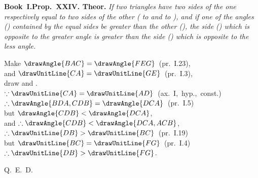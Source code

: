 \documentclass[12pt]{article}\usepackage{geometry}\geometry{a5paper,margin=1.5cm}
\begin{document}
\begin{minipage}[t]{0.52\linewidth}\vspace{0pt}%
\textbf{Book~I.\enspace Prop.\ XXIV. Theor.}
\medskip\noindent\itshape
If two triangles have two sides of the one respectively equal
to two sides of the other ( to 
and  to ), and if one of the
angles () contained by the equal sides be
greater than the other (), the side
() which is opposite to the greater angle is
greater than the side () which is opposite to
the less angle.
\bigskip\noindent\upshape\begin{center}
Make $\drawAngle{BAC}=\drawAngle{FEG}$~(pr.~I.23),\\
and $\drawUnitLine{CA}=\drawUnitLine{GE}$~(pr.~I.3),\\
draw  and .\\[6pt]
$\because \drawUnitLine{CA}=\drawUnitLine{AD}$~(ax.~I,~hyp.,~const.)\\
$\therefore \drawAngle{BDA,CDB}=\drawAngle{DCA}$~(pr.~I.5)\\
but $\drawAngle{CDB}<\drawAngle{DCA}$,\\
and $\therefore \drawAngle{CDB}<\drawAngle{DCA,ACB}$,\\[4pt]
$\therefore \drawUnitLine{DB}>\drawUnitLine{BC}$~(pr.~I.19)\\[4pt]
but $\drawUnitLine{BC}=\drawUnitLine{FG}$~(pr.~I.4)\\[4pt]
$\therefore \drawUnitLine{DB}>\drawUnitLine{FG}$.
\end{center}
\begin{flushright}Q.\ E.\ D.\end{flushright}
\end{minipage}
\end{document}
